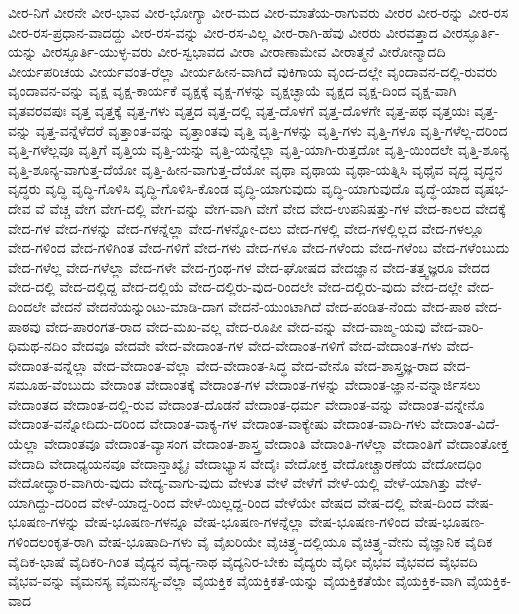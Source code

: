 {ವೀರ-ನಿಗೆ
ವೀರನೇ
ವೀರ-ಭಾವ
ವೀರ-ಭೋಗ್ಯಾ
ವೀರ-ಮದ
ವೀರ-ಮಾತೆಯ-ರಾಗುವರು
ವೀರರ
ವೀರ-ರನ್ನು
ವೀರ-ರಸ
ವೀರ-ರಸ-ಪ್ರಧಾನ-ವಾದದ್ದು
ವೀರ-ರಸ-ವನ್ನು
ವೀರ-ರಸ-ವಿಲ್ಲ
ವೀರ-ರಾಗಿ-ಹೆವು
ವೀರರು
ವೀರವತ್ತಾದ
ವೀರಸ್ಫೂರ್ತಿ-ಯನ್ನು
ವೀರಸ್ಫೂರ್ತಿ-ಯುಳ್ಳ-ವರು
ವೀರ-ಸ್ವಭಾವದ
ವೀರಾ
ವೀರಾಣಾಮೇವ
ವೀರಾತ್ಮನೆ
ವೀರೋನ್ಮಾದದಿ
ವೀರ್ಯಪರಿಚಯ
ವೀರ್ಯವಂತ-ರೆಲ್ಲಾ
ವೀರ್ಯಹೀನ-ವಾಗಿದೆ
ವುಕಿಗಾಯ
ವೃಂದ-ದಲ್ಲೇ
ವೃಂದಾವನ-ದಲ್ಲಿ-ರುವರು
ವೃಂದಾವನ-ವನ್ನು
ವೃಕ್ಷ
ವೃಕ್ಷ-ಕಾರ್ಯಕೆ
ವೃಕ್ಷಕ್ಕೆ
ವೃಕ್ಷ-ಗಳನ್ನು
ವೃಕ್ಷಚ್ಛಾಯೆ
ವೃಕ್ಷದ
ವೃಕ್ಷ-ದಿಂದ
ವೃಕ್ಷ-ವಾಗಿ
ವೃತವರವಪುಃ
ವೃತ್ತ
ವೃತ್ತಕ್ಕೆ
ವೃತ್ತ-ಗಳು
ವೃತ್ತದ
ವೃತ್ತ-ದಲ್ಲಿ
ವೃತ್ತ-ದೊಳಗೆ
ವೃತ್ತ-ದೊಳಗೇ
ವೃತ್ತ-ಪಥ
ವೃತ್ತಯಃ
ವೃತ್ತ-ವನ್ನು
ವೃತ್ತ-ವನ್ನೆಳೆದರೆ
ವೃತ್ತಾಂತ-ವನ್ನು
ವೃತ್ತಾಂತವು
ವೃತ್ತಿ
ವೃತ್ತಿ-ಗಳನ್ನು
ವೃತ್ತಿ-ಗಳು
ವೃತ್ತಿ-ಗಳೂ
ವೃತ್ತಿ-ಗಳೆಲ್ಲ-ದರಿಂದ
ವೃತ್ತಿ-ಗಳೆಲ್ಲವೂ
ವೃತ್ತಿಗೆ
ವೃತ್ತಿಯ
ವೃತ್ತಿ-ಯನ್ನು
ವೃತ್ತಿ-ಯನ್ನೆಲ್ಲಾ
ವೃತ್ತಿ-ಯಾಗಿ-ರುತ್ತದೋ
ವೃತ್ತಿ-ಯಿಂದಲೇ
ವೃತ್ತಿ-ಶೂನ್ಯ
ವೃತ್ತಿ-ಶೂನ್ಯ-ವಾಗುತ್ತ-ದೆಯೋ
ವೃತ್ತಿ-ಹೀನ-ವಾಗುತ್ತ-ದೆಯೋ
ವೃಥಾ
ವೃಥಾಯ
ವೃಥಾ-ಯತ್ನಿಸಿ
ವೃಥೈವ
ವೃದ್ಧ
ವೃದ್ಧನ
ವೃದ್ಧರು
ವೃದ್ಧಿ
ವೃದ್ಧಿ-ಗೊಳಿಸಿ
ವೃದ್ಧಿ-ಗೊಳಿಸಿ-ಕೊಂಡ
ವೃದ್ಧಿ-ಯಾಗುವುದು
ವೃದ್ಧಿ-ಯಾಗುವುದೊ
ವೃದ್ಧೆ-ಯಾದ
ವೃಷಭ-ದೇವ
ವೆ
ವೆಚ್ಚ
ವೇಗ
ವೇಗ-ದಲ್ಲಿ
ವೇಗ-ವನ್ನು
ವೇಗ-ವಾಗಿ
ವೇಗೆ
ವೇದ
ವೇದ-ಉಪನಿಷತ್ತು-ಗಳ
ವೇದ-ಕಾಲದ
ವೇದಕ್ಕೆ
ವೇದ-ಗಳ
ವೇದ-ಗಳನ್ನು
ವೇದ-ಗಳನ್ನೆಲ್ಲಾ
ವೇದ-ಗಳನ್ನೋ-ದಲು
ವೇದ-ಗಳಲ್ಲಿ
ವೇದ-ಗಳಲ್ಲಿಲ್ಲದ
ವೇದ-ಗಳಲ್ಲೂ
ವೇದ-ಗಳಿಂದ
ವೇದ-ಗಳಿಗಿಂತ
ವೇದ-ಗಳಿಗೆ
ವೇದ-ಗಳು
ವೇದ-ಗಳೂ
ವೇದ-ಗಳೆಂದು
ವೇದ-ಗಳೆಂಬ
ವೇದ-ಗಳೆಂಬುದು
ವೇದ-ಗಳೆಲ್ಲ
ವೇದ-ಗಳೆಲ್ಲಾ
ವೇದ-ಗಳೇ
ವೇದ-ಗ್ರಂಥ-ಗಳ
ವೇದ-ಘೋಷದ
ವೇದಜ್ಞಾನ
ವೇದ-ತತ್ತ್ವಜ್ಞರೂ
ವೇದದ
ವೇದ-ದಲ್ಲಿ
ವೇದ-ದಲ್ಲಿದ್ದ
ವೇದ-ದಲ್ಲಿಯೆ
ವೇದ-ದಲ್ಲಿರು-ವುದ-ರಿಂದಲೇ
ವೇದ-ದಲ್ಲಿರು-ವುದು
ವೇದ-ದಲ್ಲೇ
ವೇದ-ದಿಂದಲೇ
ವೇದನೆ
ವೇದನೆಯನ್ನುಂಟು-ಮಾಡಿ-ದಾಗ
ವೇದನೆ-ಯುಂಟಾಗಿದೆ
ವೇದ-ಪಂಡಿತ-ನೆಂದು
ವೇದ-ಪಾಠ
ವೇದ-ಪಾಠವು
ವೇದ-ಪಾರಂಗತ-ರಾದ
ವೇದ-ಮಖ-ವಲ್ಲ
ವೇದ-ರೂಪೀ
ವೇದ-ವನ್ನು
ವೇದ-ವಾಙ್ಮ-ಯವು
ವೇದ-ವಾರಿ-ಧಿಮಥ-ನದಿಂ
ವೇದವೂ
ವೇದವೇ
ವೇದ-ವೇದಾಂತ-ಗಳ
ವೇದ-ವೇದಾಂತ-ಗಳಿಗೆ
ವೇದ-ವೇದಾಂತ-ಗಳು
ವೇದ-ವೇದಾಂತ-ವನ್ನೆಲ್ಲಾ
ವೇದ-ವೇದಾಂತ-ವೆಲ್ಲಾ
ವೇದ-ವೇದಾಂತ-ಸಿದ್ಧ
ವೇದ-ವೇನೊ
ವೇದ-ಶಾಸ್ತ್ರಜ್ಞ-ರಾದ
ವೇದ-ಸಮೂಹ-ವೆಂಬುದು
ವೇದಾಂತ
ವೇದಾಂತಕ್ಕೆ
ವೇದಾಂತ-ಗಳ
ವೇದಾಂತ-ಗಳನ್ನು
ವೇದಾಂತ-ಜ್ಞಾನ-ವನ್ನಾರ್ಜಿಸಲು
ವೇದಾಂತದ
ವೇದಾಂತ-ದಲ್ಲಿ-ರುವ
ವೇದಾಂತ-ದೊಡನೆ
ವೇದಾಂತ-ಧರ್ಮ
ವೇದಾಂತ-ವನ್ನು
ವೇದಾಂತ-ವನ್ನೇನೊ
ವೇದಾಂತ-ವನ್ನೋದಿದು-ದರಿಂದ
ವೇದಾಂತ-ವಾಕ್ಯ-ಗಳ
ವೇದಾಂತ-ವಾಕ್ಯೇಷು
ವೇದಾಂತ-ವಾದಿ-ಗಳು
ವೇದಾಂತ-ವಿದೆ-ಯೆಲ್ಲಾ
ವೇದಾಂತವೂ
ವೇದಾಂತ-ವ್ಯಾಸಂಗ
ವೇದಾಂತ-ಶಾಸ್ತ್ರ
ವೇದಾಂತಿ
ವೇದಾಂತಿ-ಗಳೆಲ್ಲಾ
ವೇದಾಂತಿಗೆ
ವೇದಾಂತೋಕ್ತ
ವೇದಾದಿ
ವೇದಾಧ್ಯಯನವೂ
ವೇದಾನ್ತಾಖ್ಯೈಃ
ವೇದಾಭ್ಯಾಸ
ವೇದೈಃ
ವೇದೋಕ್ತ
ವೇದೋಚ್ಚಾರಣೆಯ
ವೇದೋದಧಿಂ
ವೇದೋದ್ಧಾರ-ವಾಗಿರು-ವುದು
ವೇದ್ಯ-ವಾಗು-ವುದು
ವೇಳುತ
ವೇಳೆ
ವೇಳೆಗೆ
ವೇಳೆ-ಯಲ್ಲಿ
ವೇಳೆ-ಯಾಗಿತ್ತು
ವೇಳೆ-ಯಾಗಿದ್ದು-ದರಿಂದ
ವೇಳೆ-ಯಾದ್ದ-ರಿಂದ
ವೇಳೆ-ಯಿಲ್ಲದ್ದ-ರಿಂದ
ವೇಳೆಯೇ
ವೇಷದ
ವೇಷ-ದಲ್ಲಿ
ವೇಷ-ದಿಂದ
ವೇಷ-ಭೂಷಣ-ಗಳನ್ನು
ವೇಷ-ಭೂಷಣ-ಗಳನ್ನೂ
ವೇಷ-ಭೂಷಣ-ಗಳನ್ನೆಲ್ಲಾ
ವೇಷ-ಭೂಷಣ-ಗಳಿಂದ
ವೇಷ-ಭೂಷಣ-ಗಳಿಂದಲಂಕೃತ-ರಾಗಿ
ವೇಷ-ಭೂಷಾದಿ-ಗಳು
ವೈ
ವೈಖರಿಯೇ
ವೈಚಿತ್ರ್ಯ-ದಲ್ಲಿಯೂ
ವೈಚಿತ್ರ್ಯ-ವೇನು
ವೈಜ್ಞಾನಿಕ
ವೈದಿಕ
ವೈದಿಕ-ಭಾಷೆ
ವೈದಿಕರಿ-ಗಿಂತ
ವೈದ್ಯನ
ವೈದ್ಯ-ನಾಥ
ವೈದ್ಯನಿರ-ಬೇಕು
ವೈದ್ಯರು
ವೈಧೀ
ವೈಭವ
ವೈಭವದ
ವೈಭವದಿ
ವೈಭವ-ವನ್ನು
ವೈಮನಸ್ಯ
ವೈಮನಸ್ಯ-ವೆಲ್ಲಾ
ವೈಯಕ್ತಿಕ
ವೈಯಕ್ತಿಕತೆ-ಯನ್ನು
ವೈಯಕ್ತಿಕತೆಯೇ
ವೈಯಕ್ತಿಕ-ವಾಗಿ
ವೈಯಕ್ತಿಕ-ವಾದ
}

